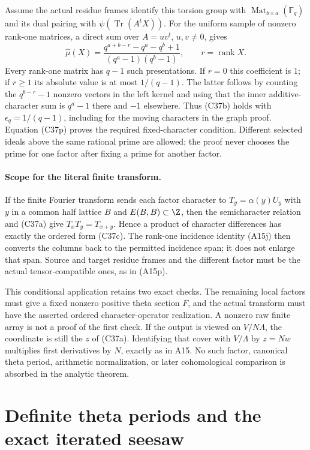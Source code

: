 \documentclass[11pt]{article}
\theoremstyle{definition}\newtheorem{definition}[theorem]{Definition}\newtheorem{remark}[theorem]{Remark}
\begin{document}
Assume the actual residue frames identify this torsion group with
$\operatorname{Mat}_{b\times a}(\mathbb F_q)$ and its dual
pairing with $\psi(\operatorname{Tr}(A^tX))$.  For the uniform
sample of nonzero rank-one matrices, a direct sum over
$A=uv^t$, $u,v\ne0$, gives
\[
 \widehat\mu(X)=
 \frac{q^{a+b-r}-q^a-q^b+1}{(q^a-1)(q^b-1)},
                  \qquad r=\operatorname{rank}X.
 \tag{C37q}
\]
Every rank-one matrix has $q-1$ such presentations.  If $r=0$
this coefficient is $1$; if $r\ge1$ its absolute value is at
most $1/(q-1)$.  The latter follows by counting the
$q^{b-r}-1$ nonzero vectors in the left kernel and using that
the inner additive-character sum is $q^a-1$ there and $-1$
elsewhere.  Thus (C37b) holds with $\epsilon_q=1/(q-1)$,
including for the moving characters in the graph proof.
Equation (C37p) proves the required fixed-character condition.
Different selected ideals above the same rational prime are
allowed; the proof never chooses the prime for one factor after
fixing a prime for another factor.

\paragraph{Scope for the literal finite transform.}
If the finite Fourier transform sends each factor character to
$T_y=\alpha(y)U_y$ with $y$ in a common half lattice $B$ and
$E(B,B)\subset\Z$, then the semicharacter relation and (C37a)
give $T_xT_y=T_{x+y}$.  Hence a product of character differences
has exactly the ordered form (C37c).  The rank-one incidence
identity (A15j) then converts the columns back to the permitted
incidence span; it does not enlarge that span.  Source and target
residue frames and the different factor must be the actual
tensor-compatible ones, as in (A15p).

This conditional application retains two exact checks.  The
remaining local factors must give a fixed nonzero positive theta
section $F$, and the actual transform must have the asserted
ordered character-operator realization.  A nonzero raw finite
array is not a proof of the first check.  If the output is viewed
on $V/N\Lambda$, the coordinate is still the $z$ of (C37a).
Identifying that cover with $V/\Lambda$ by $z=Nw$ multiplies
first derivatives by $N$, exactly as in A15.  No such factor,
canonical theta period, arithmetic normalization, or later
cohomological comparison is absorbed in the analytic theorem.


\section{Definite theta periods and the exact iterated seesaw}
\end{document}
